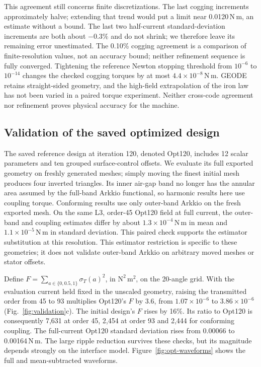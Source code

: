 \documentclass{anvil-paper}
\begin{document}
This agreement still concerns finite discretizations. The last cogging
increments approximately halve; extending that trend would put a limit
near 0.0120\,N\,m, an estimate without a bound. The last two half-current
standard-deviation increments are both about $-0.3\%$ and do not shrink;
we therefore leave its remaining error unestimated. The 0.10\% cogging
agreement is a comparison of finite-resolution values, not an accuracy
bound; neither refinement sequence is fully converged.
Tightening the reference Newton stopping threshold from $10^{-6}$ to
$10^{-14}$ changes the checked cogging torques by at most
$4.4\times10^{-8}$\,N\,m. GEODE retains straight-sided geometry, and the
high-field extrapolation of the iron law has not been varied in a paired
torque experiment. Neither cross-code agreement nor refinement proves
physical accuracy for the machine.

\subsection{Validation of the saved optimized design}\label{sec:opt120}
The saved reference design at iteration 120, denoted Opt120, includes
12 scalar parameters and ten grouped surface-control offsets. We evaluate
its full exported geometry on freshly generated meshes; simply moving
the finest initial mesh produces four inverted triangles. Its inner
air-gap band no longer has the annular area assumed by the full-band
Arkkio functional, so harmonic results here use coupling torque.
Conforming results use only outer-band Arkkio on the fresh exported mesh.
On the same L3, order-45 Opt120 field at full current, the outer-band and
coupling estimates differ by about $1.3\times10^{-4}$\,N\,m in mean and
$1.1\times10^{-5}$\,N\,m in standard deviation. This paired check supports
the estimator substitution at this resolution.
This estimator restriction is specific to these geometries; it does not
validate outer-band Arkkio on arbitrary moved meshes or stator offsets.

Define $F=\sum_{a\in\{0,0.5,1\}}\sigma_T(a)^2$, in
$\mathrm{N^2\,m^2}$, on the 20-angle grid. With the evaluation current
held fixed in the unscaled geometry, raising the transmitted order from
45 to 93 multiplies Opt120's $F$ by 3.6, from $1.07\times10^{-6}$ to
$3.86\times10^{-6}$ (Fig.~\ref{fig:validation}c). The initial design's
$F$ rises by 16\%. Its ratio to Opt120 is consequently 7,631 at order 45,
2,454 at order 93 and 2,444 for conforming coupling. The full-current
Opt120 standard deviation rises from 0.00066 to 0.00164\,N\,m.
The large ripple reduction survives these checks, but its magnitude
depends strongly on the interface model. Figure~\ref{fig:opt-waveforms}
shows the full and mean-subtracted waveforms.
\end{document}
